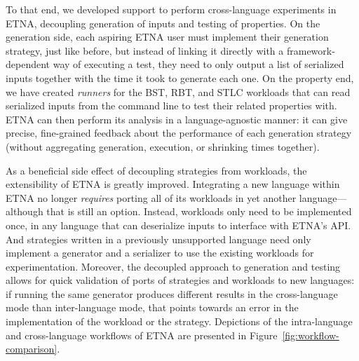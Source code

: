 To that end, we developed support to perform cross-language experiments in ETNA,
decoupling generation of inputs and testing of properties. On the generation side, each
aspiring ETNA user must implement their generation strategy, just like before, but
instead of linking it directly with a framework-dependent way of executing a test, they
need to only output a list of serialized inputs together with the time it took to
generate each one. On the property end, we have created {\em runners} for the BST, RBT,
and STLC workloads that can read serialized inputs from the command line to test their
related properties with. ETNA can then perform its analysis in a language-agnostic
manner: it can give precise, fine-grained feedback about the performance of each
generation strategy (without aggregating generation, execution, or shrinking times
together).

As a beneficial side effect of decoupling strategies from workloads, the extensibility
of ETNA is greatly improved. Integrating a new language within ETNA no longer {\em
    requires} porting all of its workloads in yet another language---although that is still
an option. Instead, workloads only need to be implemented once, in any language that
can deserialize inputs to interface with ETNA's API. And strategies written in a
previously unsupported language need only implement a generator and a serializer to use
the existing workloads for experimentation. Moreover, the decoupled approach to
generation and testing allows for quick validation of ports of strategies and workloads
to new languages: if running the same generator produces different results in the
cross-language mode than inter-language mode, that points towards an error in the
implementation of the workload or the strategy. Depictions of the intra-language and
cross-language workflows of ETNA are presented in Figure~\ref{fig:workflow-comparison}.

